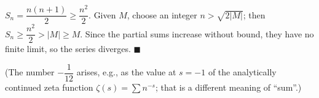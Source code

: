 $S_n=\dfrac{n(n+1)}2\ge\dfrac{n^2}2$. Given $M$, choose an integer $n>\sqrt{2|M|}$; then $S_n\ge\dfrac{n^2}{2}>|M|\ge M$. Since the partial sums increase without bound, they have no finite limit, so the series diverges. $\blacksquare$

(The number $-\dfrac1{12}$ arises, e.g., as the value at $s=-1$ of the analytically continued zeta function $\zeta(s)=\sum n^{-s}$; that is a different meaning of ``sum''.)
